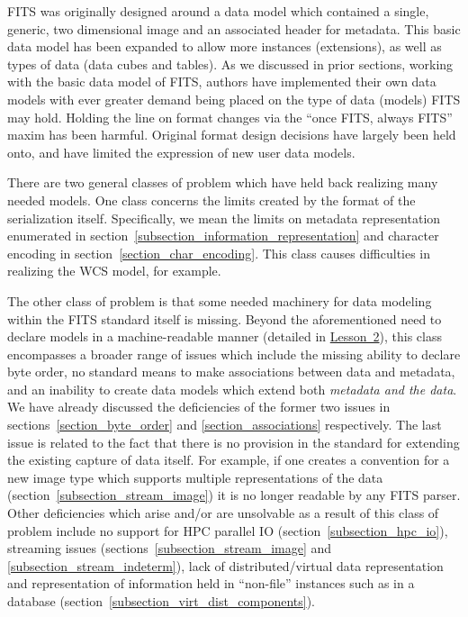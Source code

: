 \documentclass[final,authoryear,5p,times,twocolumn]{elsarticle}
\begin{document}
{{FITS was originally designed around a data model which contained a single, generic,
two dimensional image and an associated header for metadata. This basic data model
has been expanded to allow more instances (extensions), as well as types of data
(data cubes and tables).
As we discussed in prior sections, working with the basic data model of FITS,
authors have implemented their own data models with ever greater demand being
placed on the type of data (models) FITS may hold.
Holding the line on format changes via the ``once FITS, always FITS'' maxim
has been harmful.  Original format design decisions have largely been held onto,
and have limited the expression of new user data models.


There are two general classes of problem which have held back realizing
many needed models. One class concerns the limits created by the format
of the serialization itself. Specifically, we mean the limits on metadata
representation enumerated in section~\ref{subsection_information_representation}
and character encoding in section~\ref{section_char_encoding}.
This class causes difficulties in realizing the WCS model, for example.


The other class of problem is that some needed machinery for data modeling
within the FITS standard itself is missing. Beyond the aforementioned need to
declare models in a machine-readable manner (detailed in
\hyperref[section_lesson_2]{Lesson~2}), this class encompasses a broader range
of issues which include the missing ability to declare byte order,
no standard means to make associations between data and metadata, and
an inability to create data models which extend both
\textit{metadata and the data}. We have already discussed the deficiencies of
the former two issues in sections~\ref{section_byte_order} and
\ref{section_associations} respectively.  The last issue is related to the fact
that there is no provision in the standard for extending the existing capture
of data itself. For example, if one creates a convention for a new image type
which supports multiple representations of the data (section~\ref{subsection_stream_image})
it is no longer readable by any FITS parser. Other deficiencies which arise and/or are
unsolvable as a result of this class of problem include no support for HPC
parallel IO (section~\ref{subsection_hpc_io}), streaming issues
(sections~\ref{subsection_stream_image} and \ref{subsection_stream_indeterm}),
lack of distributed/virtual data representation
and representation of information held in ``non-file'' instances such as in a
database (section~\ref{subsection_virt_dist_components}).


}}
\end{document}
